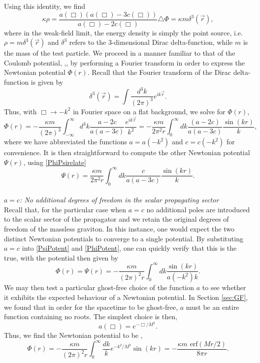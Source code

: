 Using this identity, we find
\[
\kappa\rho=\frac{a(\Box)\left(a(\Box)-3c(\Box)\right)}{a(\Box)-2c(\Box)}\triangle\Phi=\kappa m\delta^{3}(\vec{r})
, \]
where in the weak-field limit, the energy density is simply the point source, i.e. $\rho=m\delta^3({\vec r})$ and $\delta^3$ refers to the $3$-dimensional Dirac delta-function, while $m$ is the mass of the test particle. We proceed in a manner familiar to that of the Coulomb potential, \cite{Schwartz:2013pla},\cite{Kiefer:2012boa}, by performing a Fourier transform in order to express the Newtonian potential $\Phi(r)$. Recall that the Fourier transform of the Dirac delta-function is given by
\[
\delta^3({\vec r})=\int\frac{d^3 k}{(2\pi)^3}e^{ik \vec{r}}
.\]
Thus, with $\Box\rightarrow -k^2$ in Fourier space on a flat background, we solve for $\Phi(r)$,
\[
\label{PhiPotent}
\Phi(r)	=	-\frac{\kappa m}{(2\pi)^{3}}\int_{-\infty}^{\infty}d^{3}k\frac{a-2c}{a(a-3c)}\frac{e^{ik\vec{r}}}{k^{2}}=-\frac{\kappa m}{2\pi^{2}r}\int_{0}^{\infty}dk\frac{(a-2c)}{a(a-3c)}\frac{\sin(kr)}{k},
 \]
 where we have abbreviated the functions $a=a(-k^2)$ and $c=c(-k^2)$ for convenience. It is then straightforward to compute the other Newtonian potential $\Psi(r)$, using \eqref{PhiPsirelate}
 \[
 \label{PsiPotent}
 \Psi(r)=\frac{\kappa m}{2\pi^{2}r}\int_{0}^{\infty}dk\frac{c}{a(a-3c)}\frac{\sin(kr)}{k}
. \]\\
\emph{$a=c$: No additional degrees of freedom in the scalar propagating sector}\\
Recall that, for the particular case when $a=c$ no additional poles are introduced to the scalar sector of the propagator and we retain the original degrees of freedom of the massless graviton. In this instance, one would expect the two distinct Newtonian potentials to converge to a single potential. By substituting $a=c$ into \eqref{PsiPotent} and \eqref{PhiPotent}, one can quickly verify that this is the true, with the potential then given by
\[
\label{acPotent}
\Phi(r)=\Psi(r)=-\frac{\kappa m}{(2\pi)^2 r}\int_{0}^{\infty}dk\frac{\sin(kr)}{a(-k^2)k}.
 \]
 We may then test a particular ghost-free choice of the function $a$ to see whether it exhibits the expected behaviour of a Newtonian potential. In Section \ref{sec:GF}, we found that in order for the spacetime to be ghost-free, ${a}$ must be an entire function containing no roots. The simplest choice is then, 
 \[
 a(\Box)=e^{-\Box/M^2}
. \]
Thus, we find the Newtonian potential to be \cite{Biswas:2011ar},
\[
\Phi(r)=-\frac{\kappa m}{(2\pi)^2 r}\int_{0}^{\infty}\frac{dk}{k}e^{-k^{2}/M^{2}}\sin(kr)=-\frac{\kappa m \mbox{ erf}(M r/2)}{8\pi r}.
\]
